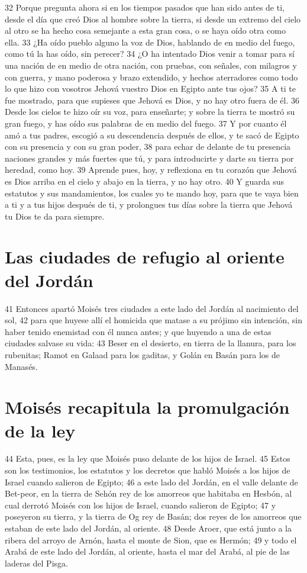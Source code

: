 32 Porque pregunta ahora si en los tiempos pasados que han sido antes de ti, desde el día que creó Dios al hombre sobre la tierra, si desde un extremo del cielo al otro se ha hecho cosa semejante a esta gran cosa, o se haya oído otra como ella.
33 ¿Ha oído pueblo alguno la voz de Dios, hablando de en medio del fuego, como tú la has oído, sin perecer?
34 ¿O ha intentado Dios venir a tomar para sí una nación de en medio de otra nación, con pruebas, con señales, con milagros y con guerra, y mano poderosa y brazo extendido, y hechos aterradores como todo lo que hizo con vosotros Jehová vuestro Dios en Egipto ante tus ojos?
35 A ti te fue mostrado, para que supieses que Jehová es Dios, y no hay otro fuera de él.
36 Desde los cielos te hizo oír su voz, para enseñarte; y sobre la tierra te mostró su gran fuego, y has oído sus palabras de en medio del fuego.
37 Y por cuanto él amó a tus padres, escogió a su descendencia después de ellos, y te sacó de Egipto con su presencia y con su gran poder,
38 para echar de delante de tu presencia naciones grandes y más fuertes que tú, y para introducirte y darte su tierra por heredad, como hoy.
39 Aprende pues, hoy, y reflexiona en tu corazón que Jehová es Dios arriba en el cielo y abajo en la tierra, y no hay otro.
40 Y guarda sus estatutos y sus mandamientos, los cuales yo te mando hoy, para que te vaya bien a ti y a tus hijos después de ti, y prolongues tus días sobre la tierra que Jehová tu Dios te da para siempre.

\section{Las ciudades de refugio al oriente del Jordán}

41 Entonces apartó Moisés tres ciudades a este lado del Jordán al nacimiento del sol,
42 para que huyese allí el homicida que matase a su prójimo sin intención, sin haber tenido enemistad con él nunca antes; y que huyendo a una de estas ciudades salvase su vida:
43 Beser en el desierto, en tierra de la llanura, para los rubenitas; Ramot en Galaad para los gaditas, y Golán en Basán para los de Manasés.

\section{Moisés recapitula la promulgación de la ley}

44 Esta, pues, es la ley que Moisés puso delante de los hijos de Israel.
45 Estos son los testimonios, los estatutos y los decretos que habló Moisés a los hijos de Israel cuando salieron de Egipto;
46 a este lado del Jordán, en el valle delante de Bet-peor, en la tierra de Sehón rey de los amorreos que habitaba en Hesbón, al cual derrotó Moisés con los hijos de Israel, cuando salieron de Egipto;
47 y poseyeron su tierra, y la tierra de Og rey de Basán; dos reyes de los amorreos que estaban de este lado del Jordán, al oriente. 
48 Desde Aroer, que está junto a la ribera del arroyo de Arnón, hasta el monte de Sion, que es Hermón; 
49 y todo el Arabá de este lado del Jordán, al oriente, hasta el mar del Arabá, al pie de las laderas del Pisga.

